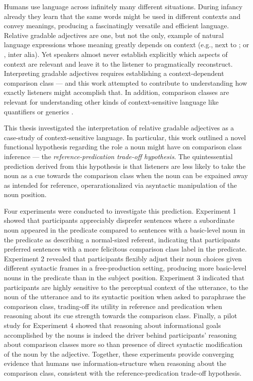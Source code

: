  Humans use language across infinitely many different situations. During infancy already they learn that the same words might be used in different contexts and convey meanings, producing a fascinatingly versatile and efficient language. 
Relative gradable adjectives are one, but not the only, example of natural language expressions whose meaning greatly depends on context (e.g., next to \textcite[indexicals][]{braun2017}; or \textcite[anaphoras][]{goldberg2017one}, inter alia). Yet speakers almost never establish explicitly which aspects of context are relevant and leave it to the listener to pragmatically reconstruct.  Interpreting gradable adjectives requires establishing a context-dependent comparison class --- and this work attempted to contribute to understanding how exactly listeners might accomplish that. In addition, comparison classes are relevant for understanding other kinds of context-sensitive language like quantifiers \parencite{scholler2017semantic} or generics \parencite{tessler2019language}. 

This thesis investigated the interpretation of relative gradable adjectives as a case-study of context-sensitive language. In particular, this work outlined a novel functional hypothesis regarding the role a noun might have on comparison class inference --- the \emph{reference-predication trade-off hypothesis}. The quintessential prediction derived from this hypothesis is that listeners are less likely to take the noun as a cue towards the comparison class when the noun can be expained away as intended for reference, operarationalized via asyntactic manipulation of the noun position. 

Four experiments were conducted to investigate this prediction. Experiment 1 showed that participants appreciably disprefer sentences where a subordinate noun appeared in the predicate compared to sentences with a basic-level noun in the predicate as describing a normal-sized referent, indicating that participants preferred sentences with a more felicitous comparison class label in the predicate. Experiment 2 revealed that participants flexibly adjust their noun choices given different syntactic frames in a free-production setting, producing more basic-level nouns in the predicate than in the subject position. Experiment 3 indicated that participants are highly sensitive to the perceptual context of the utterance, to the noun of the utterance and to its syntactic position when asked to paraphrase the comparison class, trading-off its utility in reference and predication when reasoning about its cue strength towards the comparison class. Finally, a pilot study for Experiment 4 showed that reasoning about informational goals accomplished by the nouns is indeed the driver behind participants' reasoning about comparison classes more so than presence of direct syntactic modification of the noun by the adjective. %
Together, these experiments provide converging evidence that humans use information-structure when reasoning about the comparison class, consistent with the reference-predication trade-off hypothesis. 

